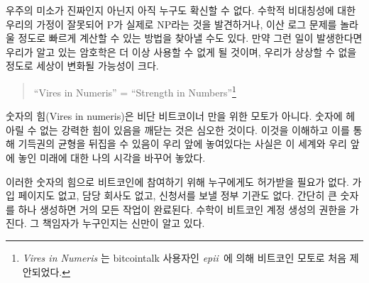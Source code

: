 \begin{comment}
	Nobody yet knows for sure if the universe's smile is genuine or not. It
	is possible that our assumption of mathematical asymmetries is wrong and
	we find that P actually equals NP \cite{wiki:pnp}, or we find surprisingly quick
	solutions to specific problems \cite{wiki:discrete-log} which we currently assume to be hard.
	If that should be the case, cryptography as we know it will cease to
	exist, and the implications would most likely change the world beyond
	recognition.
\end{comment}
우주의 미소가 진짜인지 아닌지 아직 누구도 확신할 수 없다.  
수학적 비대칭성에 대한 우리의 가정이 잘못되어 P가 실제로 NP\cite{wiki:pnp}라는 것을 발견하거나, 
이산 로그 문제\cite{wiki:discrete-log}를 놀라울 정도로 빠르게 계산할 수 있는 방법을 찾아낼 수도 있다. 
만약 그런 일이 발생한다면 우리가 알고 있는 암호학은 더 이상 사용할 수 없게 될 것이며, 
우리가 상상할 수 없을 정도로 세상이 변화될 가능성이 크다. 

\begin{quotation}\begin{samepage}
		\enquote{Vires in Numeris} = \enquote{Strength in Numbers}\footnote{\textit{Vires in Numeris} 는 bitcointalk 사용자인 \textit{epii}~\cite{epii}에 의해 
			비트코인 모토로 처음 제안되었다.}
\end{samepage}\end{quotation}

\begin{comment}
	\textit{Vires in numeris} is not only a catchy motto used by bitcoiners. The
	realization that there is an unfathomable strength to be found in
	numbers is a profound one. Understanding this, and the inversion of
	existing power balances which it enables changed my view of the world
	and the future which lies ahead of us.
\end{comment}
숫자의 힘(Vires in numeris)은 비단 비트코이너 만을 위한 모토가 아니다.
숫자에 헤아릴 수 없는 강력한 힘이 있음을 깨닫는 것은 심오한 것이다.
이것을 이해하고 이를 통해 기득권의 균형을 뒤집을 수 있음이 우리 앞에 놓여있다는 사실은
이 세계와 우리 앞에 놓인 미래에 대한 나의 시각을 바꾸어 놓았다.

\begin{comment}
	One direct result of this is the fact that you don't have to ask anyone for permission to participate in Bitcoin. 
	There is no page to sign up, no company in charge, no government agency to send application forms to.
	Simply generate a large number and you are pretty much good to go. 
	The central authority of account creation is mathematics. And God only knows who is in charge of that.
\end{comment}
이러한 숫자의 힘으로 비트코인에 참여하기 위해 누구에게도 허가받을 필요가 없다.
가입 페이지도 없고, 담당 회사도 없고, 신청서를 보낼 정부 기관도 없다.
간단히 큰 숫자를 하나 생성하면 거의 모든 작업이 완료된다. 
수학이 비트코인 계정 생성의 권한을 가진다. 그 책임자가 누구인지는 신만이 알고 있다.

